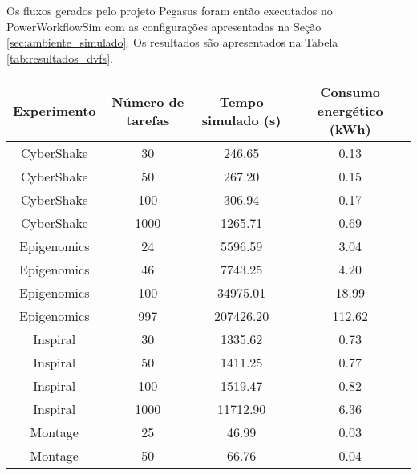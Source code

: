 Os fluxos gerados pelo projeto Pegasus foram então executados no
PowerWorkflowSim com as configurações apresentadas na Seção 
\ref{sec:ambiente_simulado}. Os resultados são apresentados na Tabela 
\ref{tab:resultados_dvfs}.

\begin{table}
	\centering
    \begin{tabular}{|c|c|c|c|}
    \hline
    \textbf{Experimento}           & \textbf{Número de tarefas} & \textbf{Tempo simulado (s)} & \textbf{Consumo energético (kWh)} \\ \hline
    CyberShake                     & 30                & 246.65             & 0.13                     \\
    CyberShake                     & 50                & 267.20             & 0.15                     \\
    CyberShake                     & 100               & 306.94             & 0.17                     \\
    CyberShake                     & 1000              & 1265.71            & 0.69                     \\ \hline
    Epigenomics                    & 24                & 5596.59            & 3.04                     \\
    Epigenomics                    & 46                & 7743.25            & 4.20                     \\
    Epigenomics                    & 100               & 34975.01           & 18.99                    \\
    Epigenomics                    & 997               & 207426.20          & 112.62                   \\ \hline
    Inspiral                       & 30                & 1335.62            & 0.73                     \\
    Inspiral                       & 50                & 1411.25            & 0.77                     \\
    Inspiral                       & 100               & 1519.47            & 0.82                     \\
    Inspiral                       & 1000              & 11712.90           & 6.36                     \\ \hline
    Montage                        & 25                & 46.99              & 0.03                     \\
    Montage                        & 50                & 66.76              & 0.04                     \\

\end{tabular}
\end{table}
